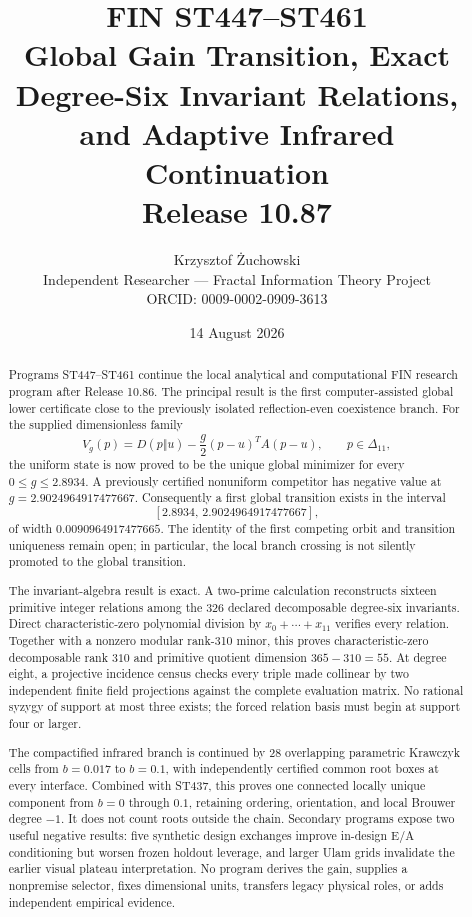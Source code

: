 \documentclass[11pt,a4paper]{article}
\title{\textbf{FIN ST447--ST461}\\[3pt]
Global Gain Transition, Exact Degree-Six Invariant Relations,\\
and Adaptive Infrared Continuation\\[6pt]
\large Release 10.87}
\author{Krzysztof Żuchowski\\
\small Independent Researcher --- Fractal Information Theory Project\\
\small ORCID: 0009-0002-0909-3613}
\date{14 August 2026}
\begin{document}
\maketitle

\begin{abstract}
Programs ST447--ST461 continue the local analytical and computational FIN
research program after Release 10.86.  The principal result is the first
computer-assisted global lower certificate close to the previously isolated
reflection-even coexistence branch.  For the supplied dimensionless family
\[
 V_g(p)=D(p\Vert u)-\frac g2(p-u)^TA(p-u),\qquad p\in\Delta_{11},
\]
the uniform state is now proved to be the unique global minimizer for every
$0\le g\le2.8934$.  A previously certified nonuniform competitor has negative
value at $g=2.9024964917477667$.  Consequently a first global transition exists
in the interval
\[
 [2.8934,\,2.9024964917477667],
\]
of width $0.0090964917477665$.  The identity of the first competing orbit and
transition uniqueness remain open; in particular, the local branch crossing
is not silently promoted to the global transition.

The invariant-algebra result is exact.  A two-prime calculation reconstructs
sixteen primitive integer relations among the 326 declared decomposable
degree-six invariants.  Direct characteristic-zero polynomial division by
$x_0+\cdots+x_{11}$ verifies every relation.  Together with a nonzero modular
rank-310 minor, this proves characteristic-zero decomposable rank $310$ and
primitive quotient dimension $365-310=55$.  At degree eight, a projective
incidence census checks every triple made collinear by two independent finite
field projections against the complete evaluation matrix.  No rational
syzygy of support at most three exists; the forced relation basis must begin
at support four or larger.

The compactified infrared branch is continued by 28 overlapping parametric
Krawczyk cells from $b=0.017$ to $b=0.1$, with independently certified common
root boxes at every interface.  Combined with ST437, this proves one connected
locally unique component from $b=0$ through $0.1$, retaining ordering,
orientation, and local Brouwer degree $-1$.  It does not count roots outside
the chain.  Secondary programs expose two useful negative results: five
synthetic design exchanges improve in-design E/A conditioning but worsen
frozen holdout leverage, and larger Ulam grids invalidate the earlier visual
plateau interpretation.  No program derives the gain, supplies a
nonpremise selector, fixes dimensional units, transfers legacy physical roles,
or adds independent empirical evidence.
\end{abstract}
\end{document}
